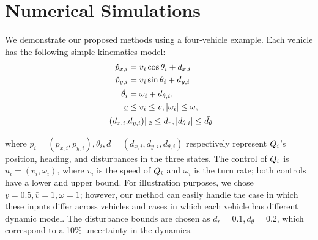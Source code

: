 \section{Numerical Simulations \label{sec:sim}}
We demonstrate our proposed methods using a four-vehicle example. Each vehicle has the following simple kinematics model:
\vspace{-0.2em}
\begin{equation}
\label{eq:dyn_i}
\begin{aligned}
\dot{p}_{x,i} &= v_i \cos \theta_i + d_{x,i} \\
\dot{p}_{y,i} &= v_i \sin \theta_i + d_{y,i}\\
\dot{\theta}_i &= \omega_i + d_{\theta,i}, \\
\underline{v} & \le v_i \le \bar{v}, |\omega_i| \le \bar{\omega},\\
\|(d_{x,i}, & d_{y,i}) \|_2 \le d_{r}, |d_{\theta,i}| \le \bar{d_{\theta}}
\end{aligned}
\end{equation}

\noindent where $p_i = (p_{x,i}, p_{y,i}), \theta_i, d = (d_{x,i}, d_{y,i}, d_{\theta,i})$ respectively represent $Q_i$'s position, heading, and disturbances in the three states. The control of $Q_i$ is $u_i = (v_i, \omega_i)$, where $v_i$ is the speed of $Q_i$ and $\omega_i$ is the turn rate; both controls have a lower and upper bound. For illustration purposes, we chose $\underline{v} = 0.5, \bar{v} = 1, \bar\omega = 1$; however, our method can easily handle the case in which these inputs differ across vehicles and cases in which each vehicle has different dynamic model. The disturbance bounds are chosen as $d_{r} = 0.1, \bar{d_{\theta}} = 0.2$, which correspond to a 10\% uncertainty in the dynamics. %

%

